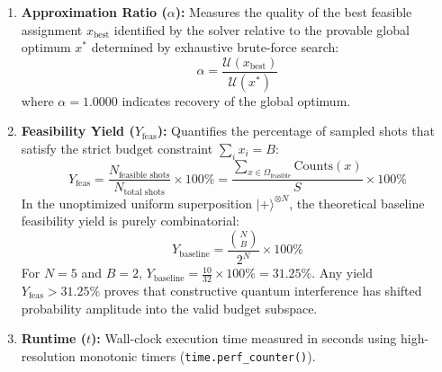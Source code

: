 \begin{enumerate}
    \item \textbf{Approximation Ratio ($\alpha$):}
    Measures the quality of the best feasible assignment $x_{\text{best}}$ identified by the solver relative to the provable global optimum $x^*$ determined by exhaustive brute-force search:
    \begin{equation}
    \label{eq:approx_ratio}
    \alpha = \frac{\mathcal{U}(x_{\text{best}})}{\mathcal{U}(x^*)}
    \end{equation}
    where $\alpha = 1.0000$ indicates recovery of the global optimum.
    
    \item \textbf{Feasibility Yield ($Y_{\text{feas}}$):}
    Quantifies the percentage of sampled shots that satisfy the strict budget constraint $\sum_{i} x_i = B$:
    \begin{equation}
    \label{eq:feasibility_yield}
    Y_{\text{feas}} = \frac{N_{\text{feasible shots}}}{N_{\text{total shots}}} \times 100\% = \frac{\sum_{x \in \Omega_{\text{feasible}}} \text{Counts}(x)}{S} \times 100\%
    \end{equation}
    In the unoptimized uniform superposition $|+\rangle^{\otimes N}$, the theoretical baseline feasibility yield is purely combinatorial:
    \begin{equation}
    Y_{\text{baseline}} = \frac{\binom{N}{B}}{2^N} \times 100\%
    \end{equation}
    For $N=5$ and $B=2$, $Y_{\text{baseline}} = \frac{10}{32} \times 100\% = 31.25\%$. Any yield $Y_{\text{feas}} > 31.25\%$ proves that constructive quantum interference has shifted probability amplitude into the valid budget subspace.
    
    \item \textbf{Runtime ($t$):}
    Wall-clock execution time measured in seconds using high-resolution monotonic timers (\texttt{time.perf\_counter()}).
\end{enumerate}
